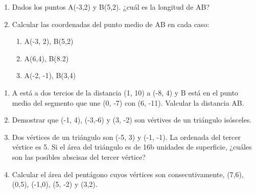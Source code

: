 \begin{frame}
\begin{enumerate}
\item Dados los puntos A(-3,2) y B(5,2). ¿cuál es la longitud de AB?
\item Calcular las coordenadas del punto medio de AB en cada caso:

\begin{enumerate}
\item A(-3, 2), B(5,2)
\item A(6,4), B(8.2)
\item A(-2, -1), B(3,4)
\end{enumerate}

\end{enumerate}
\end{frame}

\begin{frame}

\begin{enumerate}
\item A está a dos tercios de la distancia (1, 10) a (-8, 4) y B está en el punto medio del segmento que une (0, -7) con (6, -11). Valcular la distancia AB.
\item Demostrar que (-1, 4), (-3,-6) y (3, -2) son vértives de un triángulo isósceles.
\item Dos vértices de un triángulo son (-5, 3) y (-1, -1). La ordenada del tercer vértice es 5. Si el área del triángulo es de 16b unidades de superficie, ¿cuáles son las posibles abscisas del tercer vértice?
\item Calcular el área del pentágono cuyos vértices son consecutivamente, (7,6), (0,5), (-1,0), (5, -2) y (3,2).
\end{enumerate}
\end{frame}


\begin{frame}


\end{frame}

\begin{frame}


\end{frame}

\begin{frame}


\end{frame}

\begin{frame}


\end{frame}

